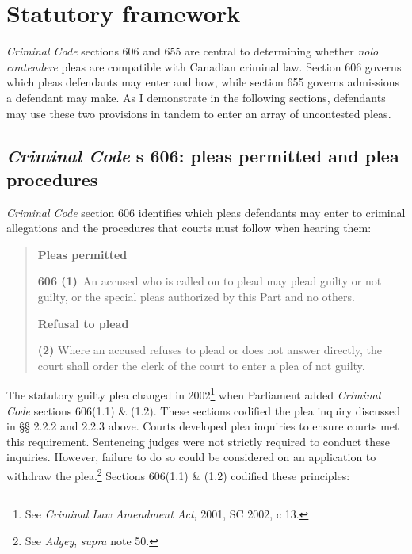 \section{Statutory framework}

\textit{Criminal Code} sections 606 and 655 are central to determining whether \textit{nolo contendere} pleas are compatible with Canadian criminal law. Section 606 governs which pleas defendants may enter and how, while section 655 governs admissions a defendant may make. As I demonstrate in the following sections, defendants may use these two provisions in tandem to enter an array of uncontested pleas.

\subsection{\textit{Criminal Code} s 606: pleas permitted and plea procedures}

\textit{Criminal Code} section 606 identifies which pleas defendants may enter to criminal allegations and the procedures that courts must follow when hearing them:

\begin{quote}
    \onehalfspacing
    \textbf{Pleas permitted}
    
    \textbf{606 (1)} An accused who is called on to plead may plead guilty or not guilty, or the special pleas authorized by this Part and no others.\medskip

    \textbf{Refusal to plead}
    
    \textbf{(2)} Where an accused refuses to plead or does not answer directly, the court shall order the clerk of the court to enter a plea of not guilty.
    
\end{quote}
The statutory guilty plea changed in 2002\footnote{See \textit{Criminal Law Amendment Act}, 2001, SC 2002, c 13.} when Parliament added \textit{Criminal Code} sections 606(1.1) \& (1.2). These sections codified the plea inquiry discussed in §§ 2.2.2 and 2.2.3 above. Courts developed plea inquiries to ensure courts met this requirement. Sentencing judges were not strictly required to conduct these inquiries. However, failure to do so could be considered on an application to withdraw the plea.\footnote{See \textit{Adgey}, \textit{supra} note 50.} Sections 606(1.1) \& (1.2) codified these principles:

